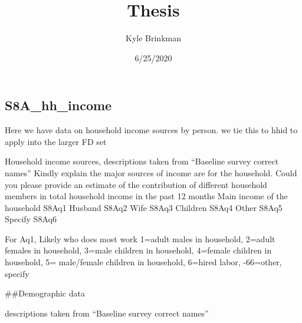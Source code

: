 \documentclass[
]{article}
\title{Thesis}
\author{Kyle Brinkman}
\date{6/25/2020}
\begin{document}
\maketitle

\hypertarget{s8a_hh_income}{%
\subsection{S8A\_hh\_income}\label{s8a_hh_income}}

Here we have data on household income sources by person. we tie this to
hhid to apply into the larger FD set

Household income sources, descriptions taken from ``Baseline survey
correct names'' Kindly explain the major sources of income are for the
household. Could you please provide an estimate of the contribution of
different household members in total household income in the past 12
months Main income of the household S8Aq1 Husband S8Aq2 Wife S8Aq3
Children S8Aq4 Other S8Aq5 Specify S8Aq6

For Aq1, Likely who does most work 1=adult males in household, 2=adult
females in household, 3=male children in household, 4=female children in
household, 5= male/female children in household, 6=hired labor,
-66=other, specify

\#\#Demographic data

descriptions taken from ``Baseline survey correct names''
\end{document}

